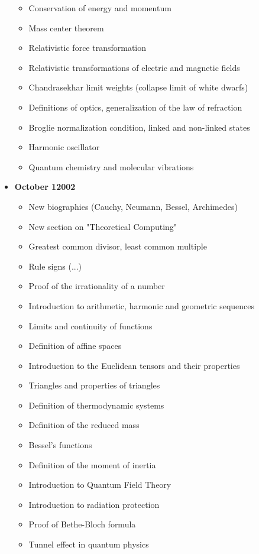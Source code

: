 \begin{itemize}
\begin{itemize}[noitemsep]
				\item Conservation of energy and momentum
				\item Mass center theorem
				\item Relativistic force transformation
				\item Relativistic transformations of electric and magnetic fields
				\item Chandrasekhar limit weights (collapse limit of white dwarfs)
				\item Definitions of optics, generalization of the law of refraction
				\item Broglie normalization condition, linked and non-linked states
				\item Harmonic oscillator
				\item Quantum chemistry and molecular vibrations
			\end{itemize}
		\item \textbf{October 12002}
			\begin{itemize}[noitemsep]
				\item New biographies (Cauchy, Neumann, Bessel, Archimedes)
				\item New section on "Theoretical Computing"
				\item Greatest common divisor, least common multiple
				\item Rule signs (...)
				\item Proof of the irrationality of a number
				\item Introduction to arithmetic, harmonic and geometric sequences
				\item Limits and continuity of functions
				\item Definition of affine spaces
				\item Introduction to the Euclidean tensors and their properties
				\item Triangles and properties of triangles
				\item Definition of thermodynamic systems
				\item Definition of the reduced mass
				\item Bessel's functions
				\item Definition of the moment of inertia
				\item Introduction to Quantum Field Theory
				\item Introduction to radiation protection
				\item Proof of Bethe-Bloch formula
				\item Tunnel effect in quantum physics

\end{itemize}
\end{itemize}
